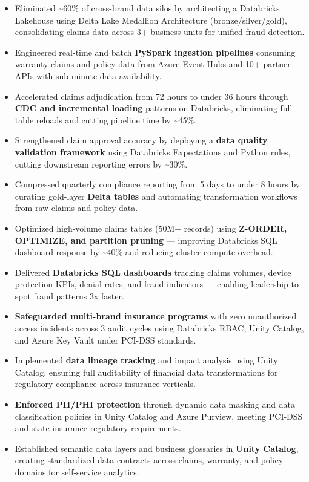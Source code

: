 \documentclass[a4paper,10pt]{article}
\begin{document}
\begin{itemize}
    \item Eliminated \textasciitilde 60\% of cross-brand data silos by architecting a Databricks Lakehouse using Delta Lake Medallion Architecture (bronze/silver/gold), consolidating claims data across 3+ business units for unified fraud detection.
    \item Engineered real-time and batch \textbf{PySpark ingestion pipelines} consuming warranty claims and policy data from Azure Event Hubs and 10+ partner APIs with sub-minute data availability.
    \item Accelerated claims adjudication from 72 hours to under 36 hours through \textbf{CDC and incremental loading} patterns on Databricks, eliminating full table reloads and cutting pipeline time by \textasciitilde 45\%.
    \item Strengthened claim approval accuracy by deploying a \textbf{data quality validation framework} using Databricks Expectations and Python rules, cutting downstream reporting errors by \textasciitilde 30\%.
    \item Compressed quarterly compliance reporting from 5 days to under 8 hours by curating gold-layer \textbf{Delta tables} and automating transformation workflows from raw claims and policy data.
    \item Optimized high-volume claims tables (50M+ records) using \textbf{Z-ORDER, OPTIMIZE, and partition pruning} — improving Databricks SQL dashboard response by \textasciitilde 40\% and reducing cluster compute overhead.
    \item Delivered \textbf{Databricks SQL dashboards} tracking claims volumes, device protection KPIs, denial rates, and fraud indicators — enabling leadership to spot fraud patterns 3x faster.
    \item \textbf{Safeguarded multi-brand insurance programs} with zero unauthorized access incidents across 3 audit cycles using Databricks RBAC, Unity Catalog, and Azure Key Vault under PCI-DSS standards.
    \item Implemented \textbf{data lineage tracking} and impact analysis using Unity Catalog, ensuring full auditability of financial data transformations for regulatory compliance across insurance verticals.
    \item \textbf{Enforced PII/PHI protection} through dynamic data masking and data classification policies in Unity Catalog and Azure Purview, meeting PCI-DSS and state insurance regulatory requirements.
    \item Established semantic data layers and business glossaries in \textbf{Unity Catalog}, creating standardized data contracts across claims, warranty, and policy domains for self-service analytics.

\end{itemize}
\end{document}
